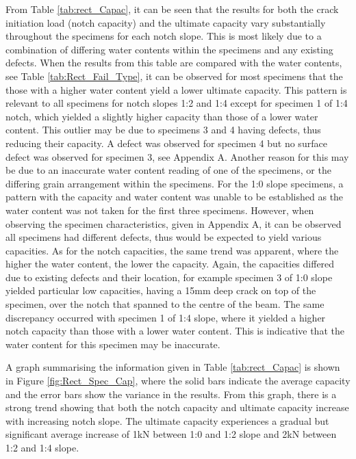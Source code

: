 \documentclass[11pt,a4paper]{article}
\numberwithin{equation}{subsection}
\begin{document}
\noindent
From Table \ref{tab:rect_Capac}, it can be seen that the results for both the crack initiation load (notch capacity) and the ultimate capacity vary substantially throughout the specimens for each notch slope. This is most likely due to a combination of differing water contents within the specimens and any existing defects. When the results from this table are compared with the water contents, see Table \ref{tab:Rect_Fail_Type}, it can be observed for most specimens that the those with a higher water content yield a lower ultimate capacity. This pattern is relevant to all specimens for notch slopes 1:2 and 1:4 except for specimen 1 of 1:4 notch, which yielded a slightly higher capacity than those of a lower water content. This outlier may be due to specimens 3 and 4 having defects, thus reducing their capacity. A defect was observed for specimen 4 but no surface defect was observed for specimen 3, see Appendix A. Another reason for this may be due to an inaccurate water content reading of one of the specimens, or the differing grain arrangement within the specimens. For the 1:0 slope specimens, a pattern with the capacity and water content was unable to be established as the water content was not taken for the first three specimens. However, when observing the specimen characteristics, given in Appendix A, it can be observed all specimens had different defects, thus would be expected to yield various capacities. As for the notch capacities, the same trend was apparent, where the higher the water content, the lower the capacity. Again, the capacities differed due to existing defects and their location, for example specimen 3 of 1:0 slope yielded particular low capacities, having a 15mm deep crack on top of the specimen, over the notch that spanned to the centre of the beam. The same discrepancy occurred with specimen 1 of 1:4 slope, where it yielded a higher notch capacity than those with a lower water content. This is indicative that the water content for this specimen may be inaccurate.  

\vspace*{\baselineskip}

\noindent
A graph summarising the information given in Table \ref{tab:rect_Capac} is shown in Figure \ref{fig:Rect_Spec_Cap}, where the solid bars indicate the average capacity and the error bars show the variance in the results. From this graph, there is a strong trend showing that both the notch capacity and ultimate capacity increase with increasing notch slope. The ultimate capacity experiences a gradual but significant average increase of 1kN between 1:0 and 1:2 slope and 2kN between 1:2 and 1:4 slope.  
\end{document}
